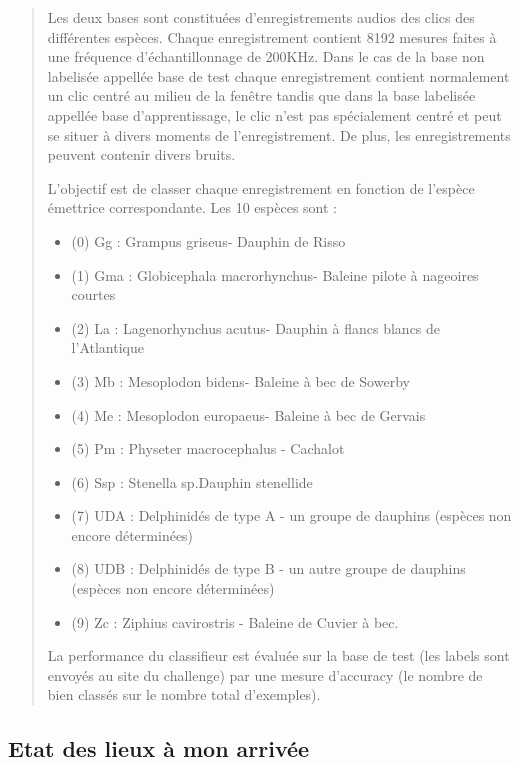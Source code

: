 \begin{quotation}
Les deux bases sont constituées d'enregistrements audios des clics des différentes espèces. Chaque enregistrement contient 8192 mesures faites à une fréquence d'échantillonnage de 200KHz. Dans le cas de la base non labelisée appellée base de test chaque enregistrement contient normalement un clic centré au milieu de la fenêtre tandis que dans la base labelisée appellée base d'apprentissage, le clic n'est pas spécialement centré et peut se situer à divers moments de l'enregistrement. De plus, les enregistrements peuvent contenir divers bruits.

L'objectif est de classer chaque enregistrement en fonction de l'espèce émettrice correspondante. Les 10 espèces sont :
\begin{itemize}
\item (0) Gg : Grampus griseus- Dauphin de Risso
\item (1) Gma : Globicephala macrorhynchus- Baleine pilote à nageoires courtes
\item (2) La : Lagenorhynchus acutus- Dauphin à flancs blancs de l'Atlantique
\item (3) Mb : Mesoplodon bidens- Baleine à bec de Sowerby
\item (4) Me : Mesoplodon europaeus- Baleine à bec de Gervais
\item (5) Pm : Physeter macrocephalus - Cachalot
\item (6) Ssp : Stenella sp.Dauphin stenellide
\item (7) UDA : Delphinidés de type A - un groupe de dauphins (espèces non encore déterminées)
\item (8) UDB : Delphinidés de type B - un autre groupe de dauphins (espèces non encore déterminées)
\item (9) Zc : Ziphius cavirostris - Baleine de Cuvier à bec.
\end{itemize}

La performance du classifieur est évaluée sur la base de test (les labels sont envoyés au site du challenge) par une mesure d'accuracy (le nombre de bien classés sur le nombre total d'exemples).
\end{quotation}

\hypertarget{Etat-des-lieux-lors-de-mon-arrivuxe9}{%
\subsection{Etat des lieux à mon arrivée}
\label{Etat-des-lieux-lors-de-mon-arrivuxe9}}

